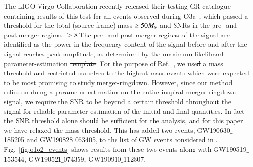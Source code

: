 
The LIGO-Virgo Collaboration recently released their testing GR
catalogue containing results \sout{of this test} for all events observed
during O3a~\cite{Abbott:2020jks}, which passed a threshold for the
total (source-frame) mass $\geq 50 M_{\odot}$ and SNRs in the pre- and
post-merger regions $\geq 8$.The pre- and post-merger regions of the
signal are identified \sout{as}  the  power \sout{in the frequency content of the
signal} before and after the signal reaches  peak
amplitude, \sout{as}  determined by the maximum 
likelihood    parameter-estimation  \sout{template}.
For the purpose of Ref.~\cite{Abbott:2020jks}, we use\sout{d} a mass
threshold and restrict\sout{ed} ourselves to the highest-mass events which
\sout{were}  expected to be most promising to study merger-ringdown. However,
since our method relies on doing a parameter estimation on the entire
inspiral-merger-ringdown signal, we require the SNR to be beyond a
certain threshold throughout the signal for reliable parameter
estimation of the initial and final quantities.  In fact the SNR
threshold alone should be sufficient for the analysis, and for this
paper we have relaxed the mass threshold. This has added two events,
GW190630$\_$185205 and GW190828$\_$063405, to the list of GW events
considered in \cite{Abbott:2020jks} . Fig.~\ref{fig:o1o2_events} shows results from these two
events along with GW190519$\_$153544, GW190521$\_$074359,
GW190910$\_$112807. 

